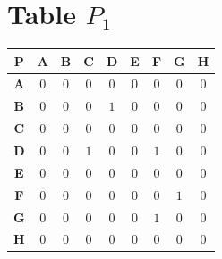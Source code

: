 \documentclass{article}
\begin{document}
\section{Table $P_{1}$}
\begin{center}
    \begin{tabular}{|c||c|c|c|c|c|c|c|c|}
        \hline
        \textbf{P} & \textbf{A} & \textbf{B} & \textbf{C} & \textbf{D} & \textbf{E} & \textbf{F} & \textbf{G} & \textbf{H} \\
        \hline
        \hline
        \textbf{A}& 0 & 0 & 0 & 0 & 0 & 0 & 0 & 0 \\
        \hline
        \textbf{B}& 0 & 0 & 0 & \cellcolor[HTML]{D74894}$1$ & 0 & 0 & 0 & 0 \\
        \hline
        \textbf{C}& 0 & 0 & 0 & 0 & 0 & 0 & 0 & 0 \\
        \hline
        \textbf{D}& 0 & 0 & \cellcolor[HTML]{D74894}$1$ & 0 & 0 & \cellcolor[HTML]{D74894}$1$ & 0 & 0 \\
        \hline
        \textbf{E}& 0 & 0 & 0 & 0 & 0 & 0 & 0 & 0 \\
        \hline
        \textbf{F}& 0 & 0 & 0 & 0 & 0 & 0 & \cellcolor[HTML]{D74894}$1$ & 0 \\
        \hline
        \textbf{G}& 0 & 0 & 0 & 0 & 0 & \cellcolor[HTML]{D74894}$1$ & 0 & 0 \\
        \hline
        \textbf{H}& 0 & 0 & 0 & 0 & 0 & 0 & 0 & 0 \\
        \hline
    \end{tabular}
\end{center}
\end{document}
